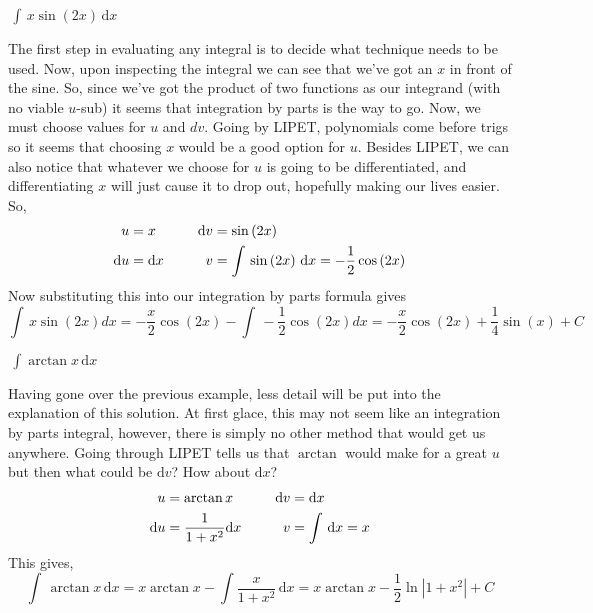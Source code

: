 \documentclass[addpoints]{exam}
\theoremstyle{definition}
\theoremstyle{plain}
\begin{document}
\begin{questions}
    \question $\displaystyle\,\int\,x\sin\left(2x\right)\,\mathrm{d}x$
    \begin{solution}[\stretch{1}]
        The first step in evaluating any integral is to decide what technique needs to be used. Now, upon inspecting the integral we can see that we've got an $x$ in front of the sine. So, since we've got the product of two functions as our integrand (with no viable $u$-sub) it seems that integration by parts is the way to go. Now, we must choose values for $u$ and $dv$. Going by LIPET, polynomials come before trigs so it seems that choosing $x$ would be a good option for $u$. Besides LIPET, we can also notice that whatever we choose for $u$ is going to be differentiated, and differentiating $x$ will just cause it to drop out, hopefully making our lives easier. So,
        \begin{align*}
            u &= x &\hspace{0.2in} \mathrm{d}v &= \sin\left(2x\right) \\
            \mathrm{d}u &= \mathrm{d}x &\hspace{0.2in} v &= \int\,\sin\left(2x\right)\,\mathrm{d}x = -\frac{1}{2}\cos\left(2x\right)
        \end{align*}
        Now substituting this into our integration by parts formula gives
        \[
            \int\,x\sin\left(2x\right)dx = -\frac{x}{2}\cos\left(2x\right) - \int\,-\frac{1}{2}\cos\left(2x\right)dx = -\frac{x}{2}\cos\left(2x\right) + \frac{1}{4}\sin\left(x\right) + C
        \]
    \end{solution}

    \ifprintanswers
        \newpage
    \fi

    \question $\displaystyle\,\int \arctan{x}\,\mathrm{d}x$
    \begin{solution}[\stretch{1}]
        Having gone over the previous example, less detail will be put into the explanation of this solution. At first glace, this may not seem like an integration by parts integral, however, there is simply no other method that would get us anywhere. Going through LIPET tells us that $\arctan$ would make for a great $u$ but then what could be $\mathrm{d}v$? How about $\mathrm{d}x$?
        \begin{align*}
            u &= \arctan{x} &\hspace{0.2in} \mathrm{d}v &= \mathrm{d}x \\
            \mathrm{d}u &= \frac{1}{{1+x^2}}\mathrm{d}x &\hspace{0.2in} v &= \int\,\mathrm{d}x = x
        \end{align*}
        This gives,
        \[
            \int\,\arctan{x}\,\mathrm{d}x = x\arctan{x} - \int \frac{x}{{1+x^2}}\,\mathrm{d}x = x\arctan{x} - \frac{1}{2}\ln\left|1+x^2\right| + C
        \]
    \end{solution}


\end{questions}
\end{document}
